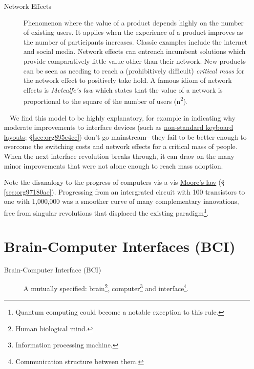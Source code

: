 \documentclass[logo,bsc,singlespacing,parskip]{infthesis}
\begin{document}
\begin{mdframed}
\begin{description}
\item[{Network Effects\label{network effects}}] Phenomenon where the value of a product depends highly on the number of existing users.
It applies when the experience of a product improves as the number of participants increases.
Classic examples include the internet and social media.
Network effects can entrench incumbent solutions which provide comparatively little value other than their network.
New products can be seen as needing to reach a (prohibitively difficult) \emph{critical mass} for the network effect to positively take hold.
A famous idiom of network effects is \emph{Metcalfe's law} which states that the value of a network is proportional to the square of the number of users (n\textsuperscript{2}).
\end{description}
\end{mdframed}
~
We find this model to be highly explanatory, for example in indicating why moderate improvements to interface devices (such as \hyperref[sec:org895c4cc]{non-standard keyboard layouts}; \S \ref{sec:org895c4cc}) don't go mainstream-- they  fail to be better enough to overcome the switching costs and network effects for a critical mass of people.
When the next interface revolution breaks through, it can draw on the many minor improvements that were not alone enough to reach mass adoption.

Note the disanalogy to the progress of computers vis-a-vis \hyperref[sec:org97180ae]{Moore's law} (§ \ref{sec:org97180ae}).
Progressing from an intergrated circuit with 100 transistors to one with 1,000,000 was a smoother curve of many complementary innovations, free from singular revolutions that displaced the existing paradigm\footnote{Quantum computing could become a notable exception to this rule.}.

\chapter{Brain-Computer Interfaces (BCI)}
\label{sec:org9ee01b8}
\begin{mdframed}
\begin{description}
\item[{\label{org75a7ab5}Brain-Computer Interface (BCI)}] A mutually specified: brain\footnote{Human biological mind.}, computer\footnote{Information processing machine.} and interface\footnote{Communication structure between them.}.
\end{description}
\end{mdframed}
\end{document}
